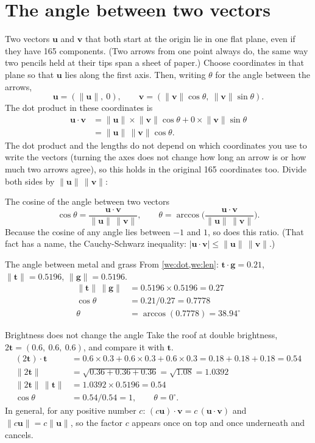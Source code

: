 \documentclass[11pt,a4paper,oneside,openany]{book}
\newcommand{\B}[1]{{\symbf{#1}}}
\newcommand{\B}[1]{{\bm{#1}}}
\newcommand{\nrm}[1]{\lVert #1\rVert}
\newcommand{\vt}{\B{t}}
\newcommand{\vu}{\B{u}}
\newcommand{\vv}{\B{v}}
\newcommand{\vg}{\B{g}}
\begin{document}
\section{The angle between two vectors}

Two vectors $\vu$ and $\vv$ that both start at the origin lie in one flat plane, even if they have 165 components. (Two
arrows from one point always do, the same way two pencils held at their tips span a sheet of paper.) Choose coordinates in
that plane so that $\vu$ lies along the first axis. Then, writing $\theta$ for the angle between the arrows,
\[
  \vu=(\nrm{\vu},\ 0),\qquad \vv=(\nrm{\vv}\cos\theta,\ \nrm{\vv}\sin\theta).
\]
The dot product in these coordinates is
\begin{align*}
\vu\cdot\vv &= \nrm{\vu}\times\nrm{\vv}\cos\theta+0\times\nrm{\vv}\sin\theta\\
            &= \nrm{\vu}\,\nrm{\vv}\cos\theta .
\end{align*}
The dot product and the lengths do not depend on which coordinates you use to write the vectors (turning the axes does not
change how long an arrow is or how much two arrows agree), so this holds in the original 165 coordinates too. Divide both
sides by $\nrm{\vu}\,\nrm{\vv}$:

\begin{rulebox}[label=rule:cos]{The cosine of the angle between two vectors}
\[
  \cos\theta=\frac{\vu\cdot\vv}{\nrm{\vu}\,\nrm{\vv}},\qquad \theta=\arccos\!\Big(\frac{\vu\cdot\vv}{\nrm{\vu}\,\nrm{\vv}}\Big).
\]
Because the cosine of any angle lies between $-1$ and $1$, so does this ratio. (That fact has a name, the Cauchy-Schwarz
inequality: $|\vu\cdot\vv|\le\nrm{\vu}\,\nrm{\vv}$.)
\end{rulebox}

\begin{worked}[label=we:angtg]{The angle between metal and grass}
From \cref{we:dot,we:len}: $\vt\cdot\vg=0.21$, $\nrm{\vt}=0.5196$, $\nrm{\vg}=0.5196$.
\begin{align*}
\nrm{\vt}\,\nrm{\vg} &= 0.5196\times0.5196=0.27\\
\cos\theta &= 0.21/0.27=0.7778\\
\theta &= \arccos(0.7778)=38.94^\circ
\end{align*}
\end{worked}

\begin{worked}[label=we:bright]{Brightness does not change the angle}
Take the roof at double brightness, $2\vt=(0.6,\ 0.6,\ 0.6)$, and compare it with $\vt$.
\begin{align*}
(2\vt)\cdot\vt &= 0.6\times0.3+0.6\times0.3+0.6\times0.3=0.18+0.18+0.18=0.54\\
\nrm{2\vt} &= \sqrt{0.36+0.36+0.36}=\sqrt{1.08}=1.0392\\
\nrm{2\vt}\,\nrm{\vt} &= 1.0392\times0.5196=0.54\\
\cos\theta &= 0.54/0.54=1, \qquad \theta=0^\circ .
\end{align*}
In general, for any positive number $c$: $(c\vu)\cdot\vv=c\,(\vu\cdot\vv)$ and $\nrm{c\vu}=c\nrm{\vu}$, so the factor $c$
appears once on top and once underneath and cancels.
\end{worked}
\end{document}
